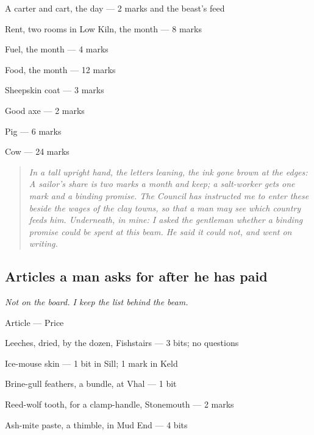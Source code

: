 \documentclass{design/chronicle}
\begin{document}
A carter and cart, the day — 2 marks and the beast’s feed\par

Rent, two rooms in Low Kiln, the month — 8 marks\par

Fuel, the month — 4 marks\par

Food, the month — 12 marks\par

Sheepskin coat — 3 marks\par

Good axe — 2 marks\par

Pig — 6 marks\par

Cow — 24 marks\par

\begin{quote}\itshape \emph{In a tall upright hand, the letters leaning, the ink gone brown at the edges:} A sailor’s share is two marks a month and keep; a salt-worker gets one mark and a binding promise. The Council has instructed me to enter these beside the wages of the clay towns, so that a man may see which country feeds him. \emph{Underneath, in mine:} I asked the gentleman whether a binding promise could be spent at this beam. He said it could not, and went on writing.\end{quote}

\subsection*{Articles a man asks for after he has paid}

\emph{Not on the board. I keep the list behind the beam.}

Article — Price\par

Leeches, dried, by the dozen, Fishstairs — 3 bits; no questions\par

Ice-mouse skin — 1 bit in Sill; 1 mark in Keld\par

Brine-gull feathers, a bundle, at Vhal — 1 bit\par

Reed-wolf tooth, for a clamp-handle, Stonemouth — 2 marks\par

Ash-mite paste, a thimble, in Mud End — 4 bits\par
\end{document}
